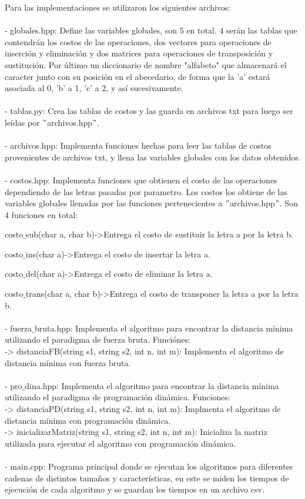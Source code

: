 Para las implementaciones se utilizaron los siguientes archivos:
\\\\
- globales.hpp: Define las variables globales, son 5 en total. 4 serán las tablas que contendrán los costos de las operaciones, dos vectores para operaciones de inserción y eliminación y dos matrices para operaciones de transposición y sustitución. Por último un diccionario de nombre "alfabeto" que almacenará el caracter junto con su posición en el abecedario, de forma que la 'a' estará asociada al 0, 'b' a 1, 'c' a 2, y así sucesivamente.
\\\\
- tablas.py: Crea las tablas de costos y las guarda en archivos txt para luego ser leídas por $"$archivos.hpp$"$.
\\\\
- archivos.hpp: Implementa funciones hechas para leer las tablas de costos provenientes de archivos txt, y llena las variables globales con los datos obtenidos.
\\\\
- costos.hpp: Implementa funciones que obtienen el costo de las operaciones dependiendo de las letras pasadas por parametro. Los costos los obtiene de las variables globales llenadas por las funciones pertenecientes a $"$archivos.hpp$"$. Son 4 funciones en total:

costo$\_$sub(char a, char b)->Entrega el costo de sustituir la letra a por la letra b.
    
costo$\_$ins(char a)->Entrega el costo de insertar la letra a.
    
costo$\_$del(char a)->Entrega el costo de eliminar la letra a.
    
costo$\_$trans(char a, char b)->Entrega el costo de transponer la letra a por la letra b.
\\\\    
- fuerza$\_$bruta.hpp: Implementa el algoritmo para encontrar la distancia mínima utilizando el paradigma de fuerza bruta. Funciónes: \\-> distanciaFB(string s1, string s2, int n, int m): Implementa el algoritmo de distancia mínima con fuerza bruta.
\\\\
- pro$\_$dina.hpp: Implementa el algoritmo para encontrar la distancia mínima utilizando el paradigma de programación dinámica. Funciones:\\-> distanciaPD(string s1, string s2, int n, int m): Implmenta el algoritmo de distancia mínima con programación dinámica.\\-> inicializarMatriz(string s1, string s2, int n, int m): Inicializa la matriz utilizada para ejecutar el algoritmo con programación dinámica.
\\\\
- main.cpp: Programa principal donde se ejecutan los algoritmos para diferentes cadenas de distintos tamaños y características, en este se miden los tiempos de ejecución de cada algoritmo y se guardan los tiempos en un archivo csv. 


